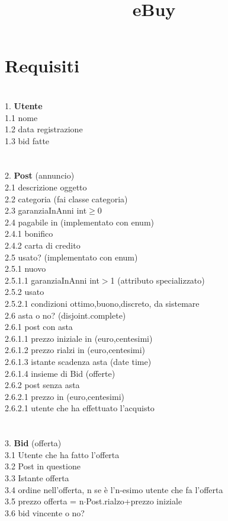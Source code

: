 \documentclass[12pt, letterpaper]{article}
\title{\textbf{eBuy}}
\date{}
\newcommand{\acc}{\\\hphantom{}\\}
\newcommand{\id}{{\hphantom{ident}}}
\begin{document}
\maketitle\section{Requisiti}
\hphantom{a}\\
1.  \textbf{Utente}\\
\id	1.1 nome\\
\id	1.2 data registrazione\\
\id	1.3 bid fatte\\
\acc
2.  \textbf{Post} (annuncio)\\
\id2.1 descrizione oggetto\\
\id2.2 categoria (fai classe categoria)\\
\id	2.3 garanziaInAnni int$\ge$0\\
\id	2.4 pagabile in (implementato con enum)\\
\id\id		2.4.1 bonifico\\
\id\id		2.4.2 carta di credito\\
\id	2.5 usato? (implementato con enum)\\
\id\id		2.5.1 nuovo\\
\id\id\id			2.5.1.1 garanziaInAnni int$>$1 (attributo specializzato)\\
\id\id	2.5.2 usato\\
\id\id\id		2.5.2.1 condizioni {ottimo,buono,discreto, da sistemare}\\
\id2.6 asta o no? (disjoint.complete)\\
\id\id		2.6.1 post con asta\\
\id\id\id		2.6.1.1 prezzo iniziale in (euro,centesimi)\\
\id\id\id		2.6.1.2 prezzo rialzi in (euro,centesimi)\\
\id\id\id		2.6.1.3 istante scadenza asta (date time)\\
\id\id\id		2.6.1.4 insieme di Bid (offerte)\\
\id\id	2.6.2 post senza asta\\
        \id\id\id		2.6.2.1 prezzo in (euro,centesimi)\\
        \id\id\id		2.6.2.1 utente che ha effettuato l'acquisto\\
\acc
3. \textbf{Bid} (offerta)\\
\id	3.1 Utente che ha fatto l'offerta\\
\id	3.2 Post in questione\\
    \id	3.3 Istante offerta \\
    \id	3.4 ordine nell'offerta, n se è l'n-esimo utente che fa l'offerta\\
    \id	3.5 prezzo offerta = n$\cdot$Post.rialzo+prezzo iniziale\\
    \id	3.6 bid vincente o no?\\
\end{document}
